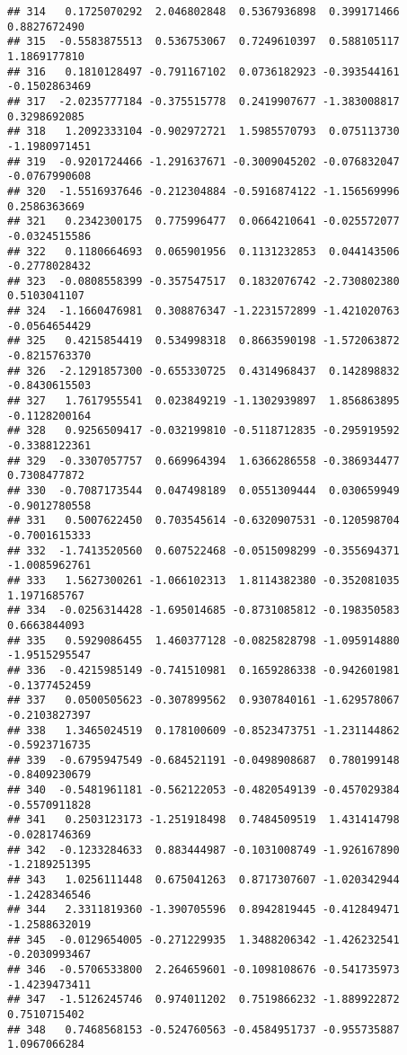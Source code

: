 \documentclass[
]{article}
\begin{document}
\begin{verbatim}
## 314   0.1725070292  2.046802848  0.5367936898  0.399171466  0.8827672490
## 315  -0.5583875513  0.536753067  0.7249610397  0.588105117  1.1869177810
## 316   0.1810128497 -0.791167102  0.0736182923 -0.393544161 -0.1502863469
## 317  -2.0235777184 -0.375515778  0.2419907677 -1.383008817  0.3298692085
## 318   1.2092333104 -0.902972721  1.5985570793  0.075113730 -1.1980971451
## 319  -0.9201724466 -1.291637671 -0.3009045202 -0.076832047 -0.0767990608
## 320  -1.5516937646 -0.212304884 -0.5916874122 -1.156569996  0.2586363669
## 321   0.2342300175  0.775996477  0.0664210641 -0.025572077 -0.0324515586
## 322   0.1180664693  0.065901956  0.1131232853  0.044143506 -0.2778028432
## 323  -0.0808558399 -0.357547517  0.1832076742 -2.730802380  0.5103041107
## 324  -1.1660476981  0.308876347 -1.2231572899 -1.421020763 -0.0564654429
## 325   0.4215854419  0.534998318  0.8663590198 -1.572063872 -0.8215763370
## 326  -2.1291857300 -0.655330725  0.4314968437  0.142898832 -0.8430615503
## 327   1.7617955541  0.023849219 -1.1302939897  1.856863895 -0.1128200164
## 328   0.9256509417 -0.032199810 -0.5118712835 -0.295919592 -0.3388122361
## 329  -0.3307057757  0.669964394  1.6366286558 -0.386934477  0.7308477872
## 330  -0.7087173544  0.047498189  0.0551309444  0.030659949 -0.9012780558
## 331   0.5007622450  0.703545614 -0.6320907531 -0.120598704 -0.7001615333
## 332  -1.7413520560  0.607522468 -0.0515098299 -0.355694371 -1.0085962761
## 333   1.5627300261 -1.066102313  1.8114382380 -0.352081035  1.1971685767
## 334  -0.0256314428 -1.695014685 -0.8731085812 -0.198350583  0.6663844093
## 335   0.5929086455  1.460377128 -0.0825828798 -1.095914880 -1.9515295547
## 336  -0.4215985149 -0.741510981  0.1659286338 -0.942601981 -0.1377452459
## 337   0.0500505623 -0.307899562  0.9307840161 -1.629578067 -0.2103827397
## 338   1.3465024519  0.178100609 -0.8523473751 -1.231144862 -0.5923716735
## 339  -0.6795947549 -0.684521191 -0.0498908687  0.780199148 -0.8409230679
## 340  -0.5481961181 -0.562122053 -0.4820549139 -0.457029384 -0.5570911828
## 341   0.2503123173 -1.251918498  0.7484509519  1.431414798 -0.0281746369
## 342  -0.1233284633  0.883444987 -0.1031008749 -1.926167890 -1.2189251395
## 343   1.0256111448  0.675041263  0.8717307607 -1.020342944 -1.2428346546
## 344   2.3311819360 -1.390705596  0.8942819445 -0.412849471 -1.2588632019
## 345  -0.0129654005 -0.271229935  1.3488206342 -1.426232541 -0.2030993467
## 346  -0.5706533800  2.264659601 -0.1098108676 -0.541735973 -1.4239473411
## 347  -1.5126245746  0.974011202  0.7519866232 -1.889922872  0.7510715402
## 348   0.7468568153 -0.524760563 -0.4584951737 -0.955735887  1.0967066284

\end{verbatim}
\end{document}
